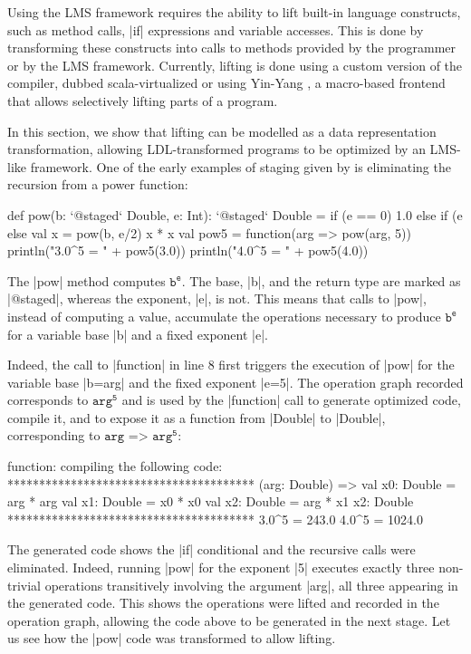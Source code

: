 Using the LMS framework requires the ability to lift built-in language constructs, such as method calls, |if| expressions and variable accesses. This is done by transforming these constructs into calls to methods provided by the programmer or by the LMS framework. Currently, lifting is done using a custom version of the compiler, dubbed scala-virtualized \cite{scala-virtualized} or using Yin-Yang \cite{yin-yang}, a macro-based frontend that allows selectively lifting parts of a program.

In this section, we show that lifting can be modelled as a data representation transformation, allowing LDL-transformed programs to be optimized by an LMS-like framework. One of the early examples of staging given by  is eliminating the recursion from a power function:

\begin{lstlisting-nobreak}
 def pow(b: `@staged` Double, e: Int): `@staged` Double =
   if (e == 0) 1.0
   else if (e %
   else {
     val x = pow(b, e/2)
     x * x
   }
 val pow5 = function(arg => pow(arg, 5))
 println("3.0^5 = " + pow5(3.0))
 println("4.0^5 = " + pow5(4.0))
\end{lstlisting-nobreak}

The |pow| method computes $\texttt{b}^{\texttt{e}}$. The base, |b|, and the return type are marked as |@staged|, whereas the exponent, |e|, is not. This means that calls to |pow|, instead of computing a value, accumulate the operations necessary to produce $\texttt{b}^{\texttt{e}}$ for a variable base |b| and a fixed exponent |e|.


Indeed, the call to |function| in line 8 first triggers the execution of |pow| for the variable base |b=arg| and the fixed exponent |e=5|. The operation graph recorded corresponds to $\texttt{arg}^{\texttt{5}}$ and is used by the |function| call to generate optimized code, compile it, and to expose it as a function from |Double| to |Double|, corresponding to $\texttt{arg => arg}^\texttt{5}$:

\begin{lstlisting-nobreak}
 function: compiling the following code:
 ***************************************
   (arg: Double) => {
     val x0: Double = arg * arg
     val x1: Double = x0 * x0
     val x2: Double = arg * x1
     x2: Double
   }
 ***************************************
 3.0^5 = 243.0
 4.0^5 = 1024.0
\end{lstlisting-nobreak}

The generated code shows the |if| conditional and the recursive calls were eliminated. Indeed, running |pow| for the exponent |5| executes exactly three non-trivial operations transitively involving the argument |arg|, all three appearing in the generated code. This shows the operations were lifted and recorded in the operation graph, allowing the code above to be generated in the next stage. Let us see how the |pow| code was transformed to allow lifting.

